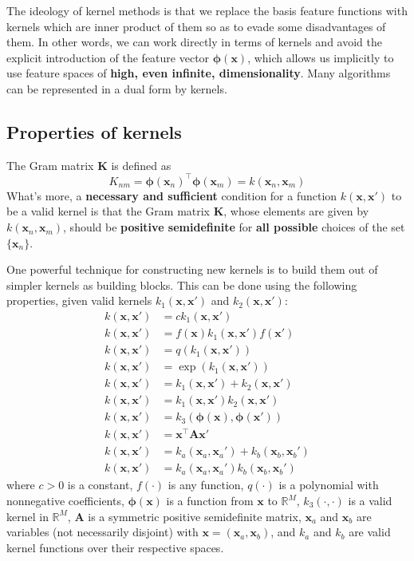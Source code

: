 \documentclass[a4paper]{report}
\renewcommand{\bf}{\mathbf}
\newcommand{\bb}{\mathbb}
\newcommand{\bs}{\boldsymbol}
\begin{document}
The ideology of kernel methods is that we replace the basis feature functions with kernels which are inner product of them so as to evade some disadvantages of them. In other words, we can work directly in terms of kernels and avoid the explicit introduction of the feature vector $\bs{\phi}(\bf{x})$, which allows us implicitly to use feature spaces of \textbf{high, even infinite, dimensionality}. Many algorithms can be represented in a dual form by kernels.

\subsection{Properties of kernels}
The Gram matrix $\bf{K}$ is defined as
\begin{equation}
	K_{nm} = \bs{\phi}(\bf{x}_n)^{\intercal} \bs{\phi}(\bf{x}_m) = k(\bf{x}_n,\bf{x}_m)
\end{equation}
What's more, a \textbf{necessary and sufficient} condition for a function $k(\bf{x,x'})$ to be a valid kernel is that the Gram matrix $\bf{K}$, whose elements are given by $k(\bf{x}_n,\bf{x}_m)$, should be \textbf{positive semidefinite} for \textbf{all possible} choices of the set $\{ \bf{x}_n \}$.

One powerful technique for constructing new kernels is to build them out of simpler kernels as building blocks. This can be done using the following properties, given valid kernels $k_1(\bf{x,x'})$ and $k_2(\bf{x,x'})$:
\begin{align}
	k(\bf{x,x'}) &= ck_1(\bf{x,x'}) \\
	k(\bf{x,x'}) &= f(\bf{x})k_1(\bf{x,x'})f(\bf{x'})\\
	k(\bf{x,x'}) &= q(k_1(\bf{x,x'}))\\
	k(\bf{x,x'}) &= \exp (k_1(\bf{x,x'}))\\
	k(\bf{x,x'}) &=k_1(\bf{x,x'})+k_2(\bf{x,x'})\\
	k(\bf{x,x'}) &=k_1(\bf{x,x'})k_2(\bf{x,x'})\\
	k(\bf{x,x'}) &=k_3(\bs{\phi}(\bf{x}),\bs{\phi}(\bf{x'}))\\
	k(\bf{x,x'}) &=\bf{x}^{\intercal} \bf{Ax'}\\
	k(\bf{x,x'}) &=k_a (\bf{x}_a,\bf{x}_a')+k_b(\bf{x}_b,\bf{x}_b')\\
	k(\bf{x,x'}) &=k_a (\bf{x}_a,\bf{x}_a')k_b(\bf{x}_b,\bf{x}_b')
\end{align}
where $c > 0$ is a constant, $f(\cdot)$ is any function, $q(\cdot)$ is a polynomial with nonnegative coefficients, $\bs{\phi}(\bf{x})$ is a function from $\bf{x}$ to $\bb{R}^M$, $k_3(\cdot,\cdot)$ is a valid kernel in $\bb{R}^M$, $\bf{A}$ is a symmetric positive semidefinite matrix, $\bf{x}_a$ and $\bf{x}_b$ are variables (not necessarily disjoint) with $\bf{x} = (\bf{x}_a, \bf{x}_b)$, and $k_a$ and $k_b$ are valid kernel functions over their respective spaces.
\end{document}

